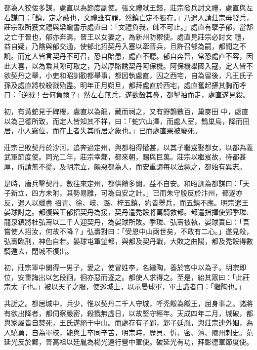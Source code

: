 \begin{pinyinscope}
 都為人狡佞多謀，處直以為節度副使。張文禮弒王鎔，莊宗發兵討文禮，處直與左右謀曰：「鎮，定之蔽也，文禮雖有罪，然鎮亡定不獨存。」乃遣人請莊宗毋發兵，莊宗取所獲文禮與梁蠟書示處直曰：「文禮負我，師不可止。」處直有孽子郁，當郜之亡于晉也，郁亦奔焉，晉王以女妻之，為新州防禦使。處直見莊宗必討文
 禮，益自疑，乃陰與郁交通，使郁北招契丹入塞以牽晉兵，且許召郁為嗣，都聞之不說。而定人皆言契丹不可召，恐自貽患，處直不聽。郁自奔晉，常恐處直不容，因此大喜，以為乘其隙可取之，乃以厚賂誘契丹阿保機。阿保機舉國入寇，定人皆不欲契丹之舉，小吏和昭訓勸都舉事，都因執處直，囚之西宅，自為留後，凡王氏子孫及處直將校殺戮殆盡。明年正月朔旦，都拜處直於西宅，處直奮起揕其胸而呼曰：「逆賊！吾何負爾？」然左右無兵，遂欲齧其鼻，都掣袖而走，處直遂見殺。



 初，有黃蛇見于碑樓，處直以為龍，藏而祠之，又有野鵲數百，巢麥田
 中，處直以為己德所致，而定人皆知其不祥，曰：「蛇穴山澤，而處人室，鵲巢烏，降而田居，小人竊位，而在上者失其所居之象也。」已而處直果被廢死。



 莊宗已敗契丹於沙河，追奔過定州，與都相得懽甚，以其子繼岌娶都女，以都為義武軍節度使。同光二年，莊宗幸鄴，都來朝，賜與巨萬。莊宗以繼岌故，待都甚厚，所請無不從。及明宗立，頗惡都為人，而安重誨每以法繩之，都始有異志。



 是時，唐兵擊契丹，數往來定州，都供饋多闕，益不自安。和昭訓為都謀曰：「天子新立，四方未附，其勢易離，可為自安之計。」已而朱守殷反於汴州，都遂亦反，遣人以蠟書
 招青、徐、岐、潞、梓五鎮，約皆舉兵，而五鎮不應。明宗遣王晏球討之。都復與王郁招契丹為援，契丹遣禿餒將萬騎救都。都遣指揮使鄭季璘、龍泉鎮將杜弘壽以二千人迎契丹，為晏球所敗。季璘、弘壽被執，晏球責曰：「吾嘗使人招汝，何故不降？」弘壽對曰：「受恩中山兩世矣，不敢有二心。」遂見殺，弘壽臨刑，神色自若。晏球屯軍望都，與都及契丹戰，大敗之曲陽，都及禿餒得數騎遁去，閉城不復出。



 初，莊宗軍中闌得一男子，愛之，使冒姓李，名繼陶，養於宮中以為子。明宗即位，安重誨出以乞段徊，徊亦惡而逐之。都使人求得之。至是，紿其眾曰：「此莊宗太
 子也。」被以天子之服，使巡城上，以示晏球軍，軍士識者曰：「繼陶也。」



 共詬之。都居城中，兵少，惟以契丹二千人守城，呼禿餒為餒王，屈身事之。諸將有欲出降者，都伺察嚴密，殺戮無虛日，以故堅守經年。天成四年二月，城破，都與家屬皆自焚死，王氏遂絕于中山。而處存有子鄴，鄴子廷胤，與莊宗連外姻，為人驍勇，自為軍校，能與士卒同辛苦，明宗時，歷貝、忻、密、澶、隰州刺史。范延光反於鄴，晉高祖以廷胤為楊光遠行營中軍使。破延光有功，拜彰德軍節度使。




\end{pinyinscope}
